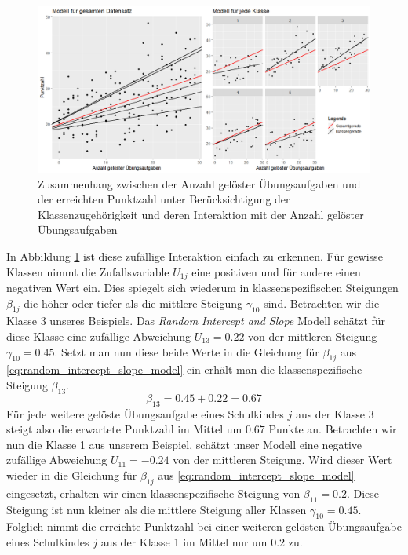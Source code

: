 \documentclass[12pt]{article}\usepackage[]{graphicx}\usepackage[]{color}
\begin{document}
\begin{figure}[ht!]
\centering
\includegraphics[width = \textwidth]{random_intercept_slope}
\caption{Zusammenhang zwischen der Anzahl gelöster Übungsaufgaben und der erreichten Punktzahl unter Berücksichtigung der Klassenzugehörigkeit und deren Interaktion mit der Anzahl gelöster Übungsaufgaben}
\label{fig:random_intercept_slope}
\end{figure}
In Abbildung \ref{fig:random_intercept_slope} ist diese zufällige Interaktion einfach zu erkennen. Für gewisse Klassen nimmt die Zufallsvariable $U_{1j}$ eine positiven und für andere einen negativen Wert ein. Dies spiegelt sich wiederum in klassenspezifischen Steigungen $\beta_{1j}$ die höher oder tiefer als die mittlere Steigung $\gamma_{10}$ sind. Betrachten wir die Klasse 3 unseres Beispiels. Das \textit{Random Intercept and Slope} Modell schätzt für diese Klasse eine zufällige Abweichung $U_{13} = 0.22$ von der mittleren Steigung $\gamma_{10} = 0.45$. Setzt man nun diese beide Werte in die Gleichung für $\beta_{1j}$ aus \eqref{eq:random_intercept_slope_model} ein erhält man die klassenspezifische Steigung $\beta_{13}$.
\begin{equation} \label{eq:beta1_example}	
\beta_{13} = 0.45 + 0.22 = 0.67
\end{equation} 
Für jede weitere gelöste Übungsaufgabe eines Schulkindes $j$ aus der Klasse 3 steigt also die erwartete Punktzahl im Mittel um $0.67$ Punkte an. Betrachten wir nun die Klasse 1 aus unserem Beispiel, schätzt unser Modell eine negative zufällige Abweichung $U_{11} = -0.24$ von der mittleren Steigung. Wird dieser Wert wieder in die Gleichung für $\beta_{1j}$ aus \eqref{eq:random_intercept_slope_model} eingesetzt, erhalten wir einen klassenspezifische Steigung von $\beta_{11} = 0.2$. Diese Steigung ist nun kleiner als die mittlere Steigung aller Klassen $\gamma_{10} = 0.45$. Folglich nimmt die erreichte Punktzahl bei einer weiteren gelösten Übungsaufgabe eines Schulkindes $j$ aus der Klasse 1 im Mittel nur um $0.2$ zu. 
\end{document}

